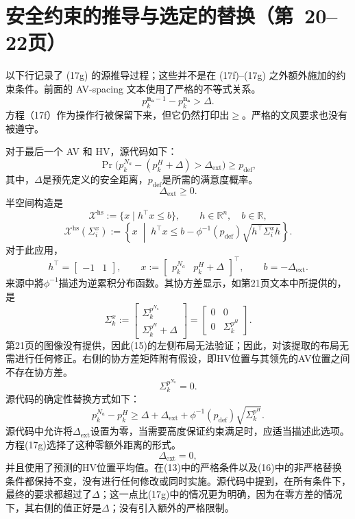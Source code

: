 \documentclass{article}
\begin{document}
\section*{安全约束的推导与选定的替换（第\ 20–22页）}
以下行记录了 (17g) 的源推导过程；这些并不是在 (17f)–(17g) 之外额外施加的约束条件。前面的 AV-spacing 文本使用了严格的不等式关系。
\[
p_k^{\mathbf{n_a}-1}-p_k^{\mathbf{n_a}}>\Delta.
\]
方程（17f）作为操作行被保留下来，但它仍然打印出$\geq$。严格的文风要求也没有被遵守。

对于最后一个 AV 和 HV，源代码如下：
\begin{equation}
\Pr\bigl(p_k^{N_a}-(p_k^H+\Delta)>\Delta_{\mathrm{ext}}\bigr)
 \geq p_{\mathrm{def}},\tag{13}
\end{equation}
其中，$\Delta$是预先定义的安全距离，$p_{\mathrm{def}}$是所需的满意度概率。
\[
\Delta_{\mathrm{ext}}\geq0.
\]
半空间构造是
\[
\mathcal X^{\mathrm{hs}}:=\{x\mid h^\top x\leq b\},\qquad
h\in\mathbb R^n,\quad b\in\mathbb R,
\]
\begin{equation}
\mathcal X^{\mathrm{hs}}(\Sigma_i^x):=
\left\{x\;\middle|\;h^\top x\leq b-\phi^{-1}(p_{\mathrm{def}})
 \sqrt{h^\top\Sigma_i^x h}\right\}.\tag{14}
\end{equation}
对于此应用，
\[
h^\top=\begin{bmatrix}-1&1\end{bmatrix},\qquad
x:=\begin{bmatrix}p_k^{N_a}&p_k^H+\Delta\end{bmatrix}^{\!\top},\qquad
b=-\Delta_{\mathrm{ext}}.
\]
来源中將$\phi^{-1}$描述为逆累积分布函数。其协方差显示，如第21页文本中所提供的，是
\begin{equation}
\Sigma_k^x:=
\begin{bmatrix}\Sigma_k^{p^{N_a}}\\ \Sigma_k^{p^H}+\Delta\end{bmatrix}
=\begin{bmatrix}0&0\\0&\Sigma_k^{p^H}\end{bmatrix}.\tag{15}
\end{equation}
第21页的图像没有提供，因此(15)的左侧布局无法验证；因此，对该提取的布局无需进行任何修正。右侧的协方差矩阵附有假设，即HV位置与其领先的AV位置之间不存在协方差。
\[
\Sigma_k^{p^{N_a}}=0.
\]
源代码的确定性替换方式如下：
\begin{equation}
p_k^{N_a}-p_k^H\geq\Delta+\Delta_{\mathrm{ext}}
 +\phi^{-1}(p_{\mathrm{def}})\sqrt{\Sigma_k^{p^H}}.\tag{16}
\end{equation}
源代码中允许将$\Delta_{\mathrm{ext}}$设置为零，当需要高度保证约束满足时，应适当描述此选项。方程(17g)选择了这种零额外距离的形式。
\[
\Delta_{\mathrm{ext}}=0,
\]
并且使用了预测的HV位置平均值。在(13)中的严格条件以及(16)中的非严格替换条件都保持不变，没有进行任何修改或同时实施。源代码中提到，在所有条件下，最终的要求都超过了$\Delta$；这一点比(17g)中的情况更为明确，因为在零方差的情况下，其右侧的值正好是$\Delta$；没有引入额外的严格限制。
\end{document}
